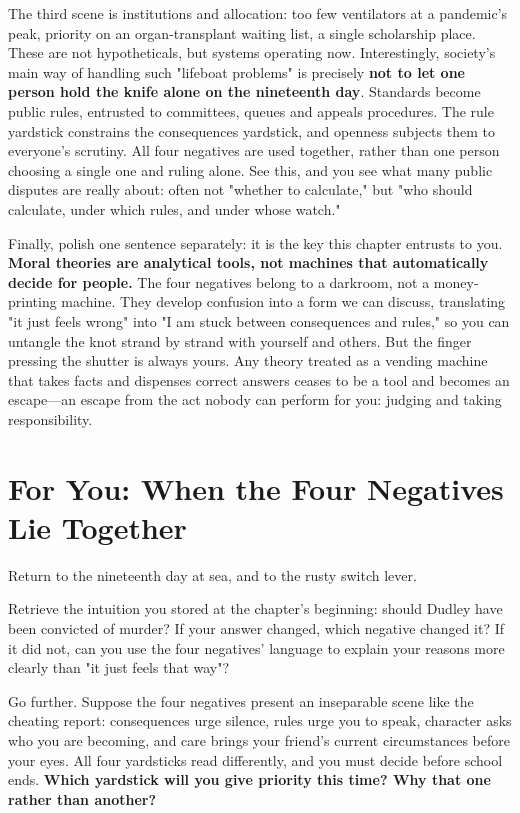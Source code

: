 The third scene is institutions and allocation: too few ventilators at a pandemic's peak, priority on an organ-transplant waiting list, a single scholarship place. These are not hypotheticals, but systems operating now. Interestingly, society's main way of handling such "lifeboat problems" is precisely \textbf{not to let one person hold the knife alone on the nineteenth day}. Standards become public rules, entrusted to committees, queues and appeals procedures. The rule yardstick constrains the consequences yardstick, and openness subjects them to everyone's scrutiny. All four negatives are used together, rather than one person choosing a single one and ruling alone. See this, and you see what many public disputes are really about: often not "whether to calculate," but "who should calculate, under which rules, and under whose watch."

Finally, polish one sentence separately: it is the key this chapter entrusts to you. \textbf{Moral theories are analytical tools, not machines that automatically decide for people.} The four negatives belong to a darkroom, not a money-printing machine. They develop confusion into a form we can discuss, translating "it just feels wrong" into "I am stuck between consequences and rules," so you can untangle the knot strand by strand with yourself and others. But the finger pressing the shutter is always yours. Any theory treated as a vending machine that takes facts and dispenses correct answers ceases to be a tool and becomes an escape---an escape from the act nobody can perform for you: judging and taking responsibility.

\section[When the Four Negatives Overlap]{For You: When the Four Negatives Lie Together}
Return to the nineteenth day at sea, and to the rusty switch lever.

Retrieve the intuition you stored at the chapter's beginning: should Dudley have been convicted of murder? If your answer changed, which negative changed it? If it did not, can you use the four negatives' language to explain your reasons more clearly than "it just feels that way"?

Go further. Suppose the four negatives present an inseparable scene like the cheating report: consequences urge silence, rules urge you to speak, character asks who you are becoming, and care brings your friend's current circumstances before your eyes. All four yardsticks read differently, and you must decide before school ends. \textbf{Which yardstick will you give priority this time? Why that one rather than another?}

